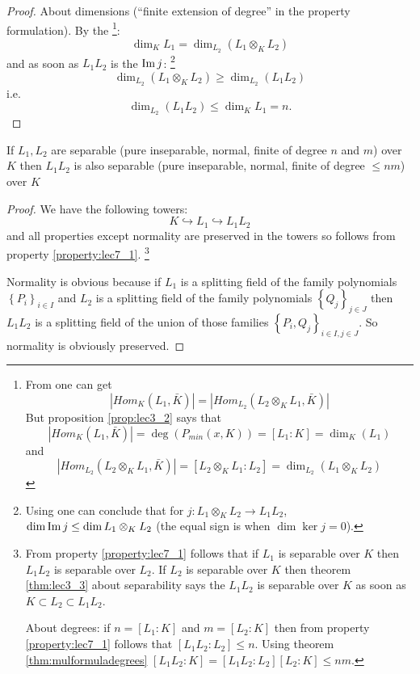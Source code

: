 \begin{property}
\begin{proof}
    About dimensions (``finite extension of degree'' in the property
    formulation). By the 
    \footnote{
      From  one can get
      \[
      \left|Hom_K\left(L_1, \bar{K}\right)\right| =
      \left|Hom_{L_2}\left(L_2 \otimes_K L_1, \bar{K}\right)\right|
      \]
      But proposition \ref{prop:lec3_2}
      says that
      \[
      \left|Hom_K\left(L_1, \bar{K}\right)\right| =
      \deg\left(P_{min}\left(x,K\right)\right) =
      \left[L_1 : K\right] = 
      \dim_K\left(L_1\right)
      \]
      and
      \[
      \left|Hom_{L_2}\left(L_2 \otimes_K L_1, \bar{K}\right)\right| =
      \left[L_2 \otimes_K L_1 : L_2\right] = 
      \dim_{L_2}\left(L_1 \otimes_K L_2 \right)
      \]
    }: 
    \[
    \dim_K L_1 = \dim_{L_2}\left(L_1 \otimes_K L_2\right)
    \]
    and as soon as $L_1 L_2$ is the $\operatorname{Im} j$:
    \footnote{
      Using  one can conclude that for
      $j: L_1 \otimes_K L_2 \to L_1L_2$,
      $\dim{\operatorname{Im}j} \le \dim{L_1\otimes_K L_2}$
      (the equal sign is when $\dim{\ker{j}} = 0$).
    }
    \[
    \dim_{L_2}\left(L_1 \otimes_K L_2\right) \ge
    \dim_{L_2}\left(L_1 L_2\right)
    \]
    i.e.
    \[
    \dim_{L_2}\left(L_1 L_2\right) \le \dim_K L_1 = n.
    \]
  \end{proof}
  \label{property:lec7_1}
\end{property}

\begin{property}
  If $L_1, L_2$ are separable (pure inseparable, normal, finite of
  degree $n$ and $m$) over $K$ then $L_1 L_2$ is also separable (pure
  inseparable, normal, finite of degree $ \le n m $) over $K$
  \begin{proof}
    We have the following towers:
    \[
    K \hookrightarrow L_1 \hookrightarrow L_1 L_2
    \]
    and all properties except normality are preserved in the towers
    so
    follows from property \ref{property:lec7_1}.
    \footnote{
      From property \ref{property:lec7_1} follows that if $L_1$ is
      separable over $K$ then $L_1 L_2$ is separable over 
      $L_2$. If $L_2$ is separable over $K$ then theorem
      \ref{thm:lec3_3} about separability says the $L_1 L_2$ is
      separable over $K$ as soon as $K \subset L_2 \subset L_1 L_2$.

      About degrees: if $n = \left[L_1 : K\right]$ and
      $m = \left[L_2 : K\right]$ then from property
      \ref{property:lec7_1} follows that
      $\left[L_1 L_2 : L_2\right] \le n$. Using theorem
      \ref{thm:mulformuladegrees}
      $\left[L_1 L_2 : K\right]  = \left[L_1 L_2 : L_2\right] \left[
        L_2 : K\right]\le nm$.
    }

    
    Normality is obvious because if $L_1$ is a splitting field of the
    family polynomials $\left\{P_i\right\}_{i \in I}$
    and $L_2$ is a splitting field of the
    family polynomials $\left\{Q_j\right\}_{j \in J}$ then
    $L_1 L_2$ is a splitting field of the union of those families
    $\left\{P_i, Q_j\right\}_{i \in I, j \in J}$. So normality is
    obviously preserved.  
  \end{proof}
  \label{property:lec7_2}
\end{property}


